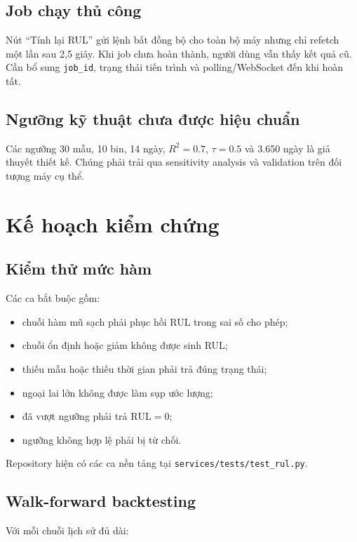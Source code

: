\documentclass[12pt,a4paper]{article}
\newcommand{\RUL}{\mathrm{RUL}}
\newcommand{\Rtwo}{R^{2}}
\newcommand{\code}[1]{\texttt{#1}}
\begin{document}
\subsection{Job chạy thủ công}

Nút ``Tính lại RUL'' gửi lệnh bất đồng bộ cho toàn bộ máy nhưng chỉ refetch một lần sau 2,5 giây. Khi job chưa hoàn thành, người dùng vẫn thấy kết quả cũ. Cần bổ sung \code{job\_id}, trạng thái tiến trình và polling/WebSocket đến khi hoàn tất.

\subsection{Ngưỡng kỹ thuật chưa được hiệu chuẩn}

Các ngưỡng 30 mẫu, 10 bin, 14 ngày, $\Rtwo=0.7$, $\tau=0.5$ và 3.650 ngày là giả thuyết thiết kế. Chúng phải trải qua sensitivity analysis và validation trên đối tượng máy cụ thể.

\section{Kế hoạch kiểm chứng}

\subsection{Kiểm thử mức hàm}

Các ca bắt buộc gồm:

\begin{itemize}
  \item chuỗi hàm mũ sạch phải phục hồi RUL trong sai số cho phép;
  \item chuỗi ổn định hoặc giảm không được sinh RUL;
  \item thiếu mẫu hoặc thiếu thời gian phải trả đúng trạng thái;
  \item ngoại lai lớn không được làm sụp ước lượng;
  \item đã vượt ngưỡng phải trả $\RUL=0$;
  \item ngưỡng không hợp lệ phải bị từ chối.
\end{itemize}

Repository hiện có các ca nền tảng tại \code{services/tests/test\_rul.py}.

\subsection{Walk-forward backtesting}

Với mỗi chuỗi lịch sử đủ dài:
\end{document}
